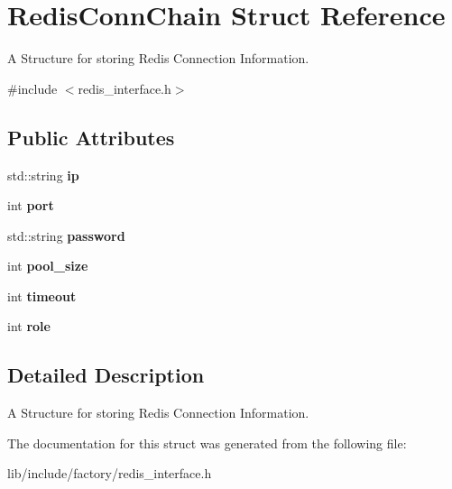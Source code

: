 \hypertarget{structRedisConnChain}{\section{Redis\-Conn\-Chain Struct Reference}
\label{structRedisConnChain}
}


A Structure for storing Redis Connection Information.  




{\ttfamily \#include $<$redis\-\_\-interface.\-h$>$}

\subsection*{Public Attributes}
\begin{DoxyCompactItemize}
\item 
\hypertarget{structRedisConnChain_a4694dc63aa9ea1864ddd3bd32324a517}{std\-::string {\bfseries ip}}\label{structRedisConnChain_a4694dc63aa9ea1864ddd3bd32324a517}

\item 
\hypertarget{structRedisConnChain_a5cc9c60a354a6519ab6738a97a30acf9}{int {\bfseries port}}\label{structRedisConnChain_a5cc9c60a354a6519ab6738a97a30acf9}

\item 
\hypertarget{structRedisConnChain_a8bbae840be9aab68e4c98f813915b44c}{std\-::string {\bfseries password}}\label{structRedisConnChain_a8bbae840be9aab68e4c98f813915b44c}

\item 
\hypertarget{structRedisConnChain_a9d8d3258596c3de62a7a71207df2617f}{int {\bfseries pool\-\_\-size}}\label{structRedisConnChain_a9d8d3258596c3de62a7a71207df2617f}

\item 
\hypertarget{structRedisConnChain_aa8503e6bf1350950dda24ad76cd48e24}{int {\bfseries timeout}}\label{structRedisConnChain_aa8503e6bf1350950dda24ad76cd48e24}

\item 
\hypertarget{structRedisConnChain_a92766bf2d64183f8e56515302215b4be}{int {\bfseries role}}\label{structRedisConnChain_a92766bf2d64183f8e56515302215b4be}

\end{DoxyCompactItemize}


\subsection{Detailed Description}
A Structure for storing Redis Connection Information. 

The documentation for this struct was generated from the following file\-:\begin{DoxyCompactItemize}
\item 
lib/include/factory/redis\-\_\-interface.\-h\end{DoxyCompactItemize}
